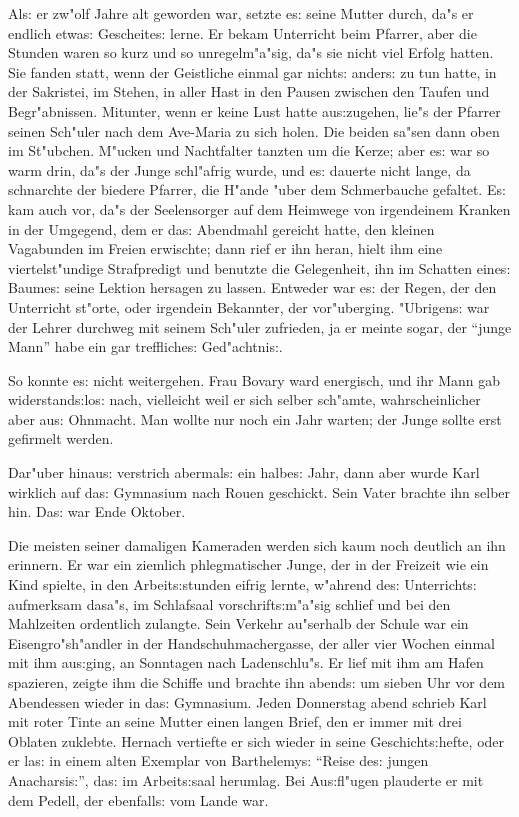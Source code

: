 \documentclass[oneside,12pt]{book}
\newcommand{\s}{s:}%
\begin{document}
Al{\s} er zw"olf Jahre alt geworden war, setzte e{\s} seine Mutter
durch, da"s er endlich etwa{\s} Gescheite{\s} lerne. Er bekam
Unterricht beim Pfarrer, aber die Stunden waren so kurz und so
unregelm"a"sig, da"s sie nicht viel Erfolg hatten. Sie fanden
statt, wenn der Geistliche einmal gar nicht{\s} ander{\s} zu tun
hatte, in der Sakristei, im Stehen, in aller Hast in den Pausen
zwischen den Taufen und Begr"abnissen. Mitunter, wenn er keine
Lust hatte au{\s}zugehen, lie"s der Pfarrer seinen Sch"uler nach
dem Ave-Maria zu sich holen. Die beiden sa"sen dann oben im
St"ubchen. M"ucken und Nachtfalter tanzten um die Kerze; aber
e{\s} war so warm drin, da"s der Junge schl"afrig wurde, und e{\s}
dauerte nicht lange, da schnarchte der biedere Pfarrer, die H"ande
"uber dem Schmerbauche gefaltet. E{\s} kam auch vor, da"s der
Seelensorger auf dem Heimwege von irgendeinem Kranken in der
Umgegend, dem er da{\s} Abendmahl gereicht hatte, den kleinen
Vagabunden im Freien erwischte; dann rief er ihn heran, hielt ihm
eine viertelst"undige Strafpredigt und benutzte die Gelegenheit,
ihn im Schatten eine{\s} Baume{\s} seine Lektion hersagen zu
lassen. Entweder war e{\s} der Regen, der den Unterricht st"orte,
oder irgendein Bekannter, der vor"uberging. "Ubrigen{\s} war der
Lehrer durchweg mit seinem Sch"uler zufrieden, ja er meinte sogar,
der "`junge Mann"' habe ein gar treffliche{\s} Ged"achtni{\s}.

So konnte e{\s} nicht weitergehen. Frau Bovary ward energisch, und
ihr Mann gab widerstand{\s}lo{\s} nach, vielleicht weil er sich
selber sch"amte, wahrscheinlicher aber au{\s} Ohnmacht. Man wollte
nur noch ein Jahr warten; der Junge sollte erst gefirmelt werden.

Dar"uber hinau{\s} verstrich abermal{\s} ein halbe{\s} Jahr, dann
aber wurde Karl wirklich auf da{\s} Gymnasium nach Rouen
geschickt. Sein Vater brachte ihn selber hin. Da{\s} war Ende
Oktober.

Die meisten seiner damaligen Kameraden werden sich kaum noch
deutlich an ihn erinnern. Er war ein ziemlich phlegmatischer
Junge, der in der Freizeit wie ein Kind spielte, in den
Arbeit{\s}stunden eifrig lernte, w"ahrend de{\s} Unterricht{\s}
aufmerksam dasa"s, im Schlafsaal vorschrift{\s}m"a"sig schlief und
bei den Mahlzeiten ordentlich zulangte. Sein Verkehr au"serhalb
der Schule war ein Eisengro"sh"andler in der Handschuhmachergasse,
der aller vier Wochen einmal mit ihm au{\s}ging, an Sonntagen nach
Ladenschlu"s. Er lief mit ihm am Hafen spazieren, zeigte ihm die
Schiffe und brachte ihn abend{\s} um sieben Uhr vor dem Abendessen
wieder in da{\s} Gymnasium. Jeden Donnerstag abend schrieb Karl
mit roter Tinte an seine Mutter einen langen Brief, den er immer
mit drei Oblaten zuklebte. Hernach vertiefte er sich wieder in
seine Geschicht{\s}hefte, oder er la{\s} in einem alten Exemplar
von Barthelemy{\s} "`Reise de{\s} jungen Anacharsi{\s}"', da{\s}
im Arbeit{\s}saal herumlag. Bei Au{\s}fl"ugen plauderte er mit dem
Pedell, der ebenfall{\s} vom Lande war.
\end{document}

